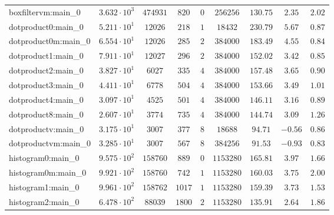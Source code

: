 \begin{tabular}{|l|c|c|c|c|c|c|c|c|}
boxfiltervm:main\_0            & $ 3.632 \cdot 10^{3} $ & $ 474931   $ & $ 820    $ & $ 0    $ & $ 256256   $ & $ 130.75      $ & $ 2.35    $ & $ 2.02    $ \\
dotproduct0:main\_0            & $ 5.211 \cdot 10^{1} $ & $ 12026    $ & $ 218    $ & $ 1    $ & $ 18432    $ & $ 230.79      $ & $ 5.67    $ & $ 0.87    $ \\
dotproduct0m:main\_0           & $ 6.554 \cdot 10^{1} $ & $ 12026    $ & $ 285    $ & $ 2    $ & $ 384000   $ & $ 183.49      $ & $ 4.55    $ & $ 0.84    $ \\
dotproduct1:main\_0            & $ 7.911 \cdot 10^{1} $ & $ 12027    $ & $ 296    $ & $ 2    $ & $ 384000   $ & $ 152.02      $ & $ 3.42    $ & $ 0.85    $ \\
dotproduct2:main\_0            & $ 3.827 \cdot 10^{1} $ & $ 6027     $ & $ 335    $ & $ 4    $ & $ 384000   $ & $ 157.48      $ & $ 3.65    $ & $ 0.90    $ \\
dotproduct3:main\_0            & $ 4.411 \cdot 10^{1} $ & $ 6778     $ & $ 504    $ & $ 4    $ & $ 384000   $ & $ 153.66      $ & $ 3.49    $ & $ 1.01    $ \\
dotproduct4:main\_0            & $ 3.097 \cdot 10^{1} $ & $ 4525     $ & $ 501    $ & $ 4    $ & $ 384000   $ & $ 146.11      $ & $ 3.16    $ & $ 0.89    $ \\
dotproduct8:main\_0            & $ 2.607 \cdot 10^{1} $ & $ 3774     $ & $ 735    $ & $ 4    $ & $ 384000   $ & $ 144.74      $ & $ 3.09    $ & $ 1.26    $ \\
dotproductv:main\_0            & $ 3.175 \cdot 10^{1} $ & $ 3007     $ & $ 377    $ & $ 8    $ & $ 18688    $ & $ 94.71       $ & $ -0.56   $ & $ 0.86    $ \\
dotproductvm:main\_0           & $ 3.285 \cdot 10^{1} $ & $ 3007     $ & $ 567    $ & $ 8    $ & $ 384256   $ & $ 91.53       $ & $ -0.93   $ & $ 0.83    $ \\
histogram0:main\_0             & $ 9.575 \cdot 10^{2} $ & $ 158760   $ & $ 889    $ & $ 0    $ & $ 1153280  $ & $ 165.81      $ & $ 3.97    $ & $ 1.66    $ \\
histogram0m:main\_0            & $ 9.921 \cdot 10^{2} $ & $ 158760   $ & $ 742    $ & $ 1    $ & $ 1153280  $ & $ 160.03      $ & $ 3.75    $ & $ 2.00    $ \\
histogram1:main\_0             & $ 9.961 \cdot 10^{2} $ & $ 158762   $ & $ 1017   $ & $ 1    $ & $ 1153280  $ & $ 159.39      $ & $ 3.73    $ & $ 1.53    $ \\
histogram2:main\_0             & $ 6.478 \cdot 10^{2} $ & $ 88039    $ & $ 1800   $ & $ 2    $ & $ 1153280  $ & $ 135.91      $ & $ 2.64    $ & $ 1.86    $ \\

\end{tabular}
